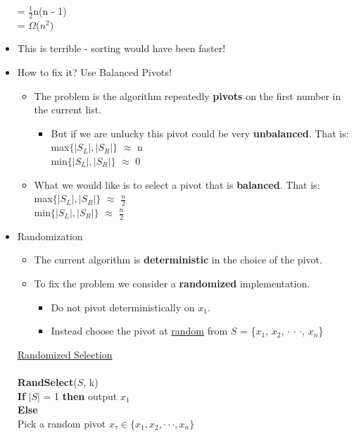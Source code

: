 \documentclass[12pt]{article}
\newcommand{\forceindent}{\leavevmode{\parindent=1em\indent}}
\begin{document}
\begin{itemize}
{\hspace*{9mm} = {\Large$\frac{1}{2}$}n(n - 1)\\
\hspace*{9mm} = $\Omega$($n^2$)
}
\item This is terrible - sorting would have been faster!
\item How to fix it? Use Balanced Pivots!
 	\begin{itemize}
	\item The problem is the algorithm repeatedly \textbf{pivots} on the first number in the current list.
		\begin{itemize}
		\item But if we are unlucky this pivot could be very \textbf{unbalanced}. That is:\\
		{\large
		max$\{|S_L|, |S_R|\}$ $\approx$ n \\
		min$\{|S_L|, |S_R|\}$ $\approx$ 0
		}
		\end{itemize}
	\item What we would like is to select a pivot that is \textbf{balanced}. That is:\\
	{\large max$\{|S_L|, |S_R|\}$ $\approx$ $\frac{n}{2}$} \\
	{\large min$\{|S_L|, |S_R|\}$ $\approx$ $\frac{n}{2}$}
	\end{itemize}
\item Randomization
	\begin{itemize}
	\item The current algorithm is \textbf{deterministic} in the choice of the pivot.
	\item To fix the problem we consider a \textbf{randomized} implementation.
		\begin{itemize}
		\item Do not pivot deterministically on $x_1$.
		\item Instead choose the pivot at \underline{random} from $S$ = \{$x_1$, $x_2$, $\cdot$ $\cdot$ $\cdot$, $x_n$\}
		\end{itemize}
	\end{itemize}
{\large
\underline{Randomized Selection}\\
\\
\textbf{RandSelect}($S$, k)\\
\textbf{If} $|S|$ = 1 \textbf{then} output $x_1$\\
\textbf{Else}\\
\forceindent Pick a random pivot $x_{\tau} \in \{x_1, x_2, \cdot \cdot \cdot, x_n\}$\\
}
\end{itemize}
\end{document}
